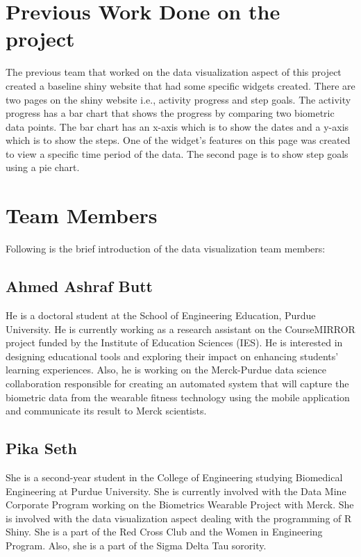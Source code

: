 \documentclass[]{book}
\begin{document}
\section{Previous Work Done on the
project}\label{previous-work-done-on-the-project}

The previous team that worked on the data visualization aspect of this
project created a baseline shiny website that had some specific widgets
created. There are two pages on the shiny website i.e., activity
progress and step goals. The activity progress has a bar chart that
shows the progress by comparing two biometric data points. The bar chart
has an x-axis which is to show the dates and a y-axis which is to show
the steps. One of the widget's features on this page was created to view
a specific time period of the data. The second page is to show step
goals using a pie chart.

\section{Team Members}\label{team-members}

Following is the brief introduction of the data visualization team
members:

\subsection{Ahmed Ashraf Butt}\label{ahmed-ashraf-butt}

He is a doctoral student at the School of Engineering Education, Purdue
University. He is currently working as a research assistant on the
CourseMIRROR project funded by the Institute of Education Sciences
(IES). He is interested in designing educational tools and exploring
their impact on enhancing students' learning experiences. Also, he is
working on the Merck-Purdue data science collaboration responsible for
creating an automated system that will capture the biometric data from
the wearable fitness technology using the mobile application and
communicate its result to Merck scientists.

\subsection{Pika Seth}\label{pika-seth}

She is a second-year student in the College of Engineering studying
Biomedical Engineering at Purdue University. She is currently involved
with the Data Mine Corporate Program working on the Biometrics Wearable
Project with Merck. She is involved with the data visualization aspect
dealing with the programming of R Shiny. She is a part of the Red Cross
Club and the Women in Engineering Program. Also, she is a part of the
Sigma Delta Tau sorority.
\end{document}
